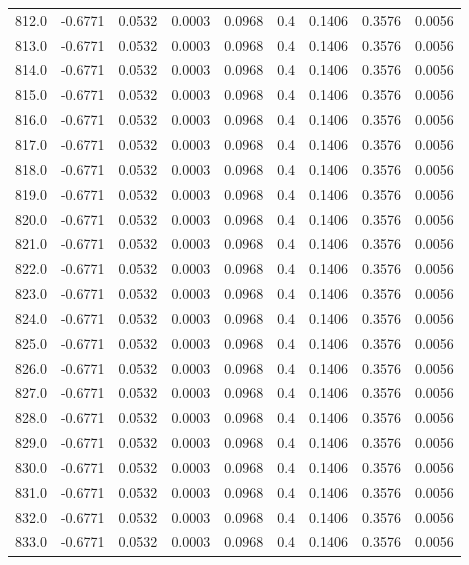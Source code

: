 \begin{longtable}{lrrrrrrrr}
812.0 & -0.6771 & 0.0532 & 0.0003 & 0.0968 & 0.4 & 0.1406 & 0.3576 & 0.0056 \\
813.0 & -0.6771 & 0.0532 & 0.0003 & 0.0968 & 0.4 & 0.1406 & 0.3576 & 0.0056 \\
814.0 & -0.6771 & 0.0532 & 0.0003 & 0.0968 & 0.4 & 0.1406 & 0.3576 & 0.0056 \\
815.0 & -0.6771 & 0.0532 & 0.0003 & 0.0968 & 0.4 & 0.1406 & 0.3576 & 0.0056 \\
816.0 & -0.6771 & 0.0532 & 0.0003 & 0.0968 & 0.4 & 0.1406 & 0.3576 & 0.0056 \\
817.0 & -0.6771 & 0.0532 & 0.0003 & 0.0968 & 0.4 & 0.1406 & 0.3576 & 0.0056 \\
818.0 & -0.6771 & 0.0532 & 0.0003 & 0.0968 & 0.4 & 0.1406 & 0.3576 & 0.0056 \\
819.0 & -0.6771 & 0.0532 & 0.0003 & 0.0968 & 0.4 & 0.1406 & 0.3576 & 0.0056 \\
820.0 & -0.6771 & 0.0532 & 0.0003 & 0.0968 & 0.4 & 0.1406 & 0.3576 & 0.0056 \\
821.0 & -0.6771 & 0.0532 & 0.0003 & 0.0968 & 0.4 & 0.1406 & 0.3576 & 0.0056 \\
822.0 & -0.6771 & 0.0532 & 0.0003 & 0.0968 & 0.4 & 0.1406 & 0.3576 & 0.0056 \\
823.0 & -0.6771 & 0.0532 & 0.0003 & 0.0968 & 0.4 & 0.1406 & 0.3576 & 0.0056 \\
824.0 & -0.6771 & 0.0532 & 0.0003 & 0.0968 & 0.4 & 0.1406 & 0.3576 & 0.0056 \\
825.0 & -0.6771 & 0.0532 & 0.0003 & 0.0968 & 0.4 & 0.1406 & 0.3576 & 0.0056 \\
826.0 & -0.6771 & 0.0532 & 0.0003 & 0.0968 & 0.4 & 0.1406 & 0.3576 & 0.0056 \\
827.0 & -0.6771 & 0.0532 & 0.0003 & 0.0968 & 0.4 & 0.1406 & 0.3576 & 0.0056 \\
828.0 & -0.6771 & 0.0532 & 0.0003 & 0.0968 & 0.4 & 0.1406 & 0.3576 & 0.0056 \\
829.0 & -0.6771 & 0.0532 & 0.0003 & 0.0968 & 0.4 & 0.1406 & 0.3576 & 0.0056 \\
830.0 & -0.6771 & 0.0532 & 0.0003 & 0.0968 & 0.4 & 0.1406 & 0.3576 & 0.0056 \\
831.0 & -0.6771 & 0.0532 & 0.0003 & 0.0968 & 0.4 & 0.1406 & 0.3576 & 0.0056 \\
832.0 & -0.6771 & 0.0532 & 0.0003 & 0.0968 & 0.4 & 0.1406 & 0.3576 & 0.0056 \\
833.0 & -0.6771 & 0.0532 & 0.0003 & 0.0968 & 0.4 & 0.1406 & 0.3576 & 0.0056 \\

\end{longtable}
